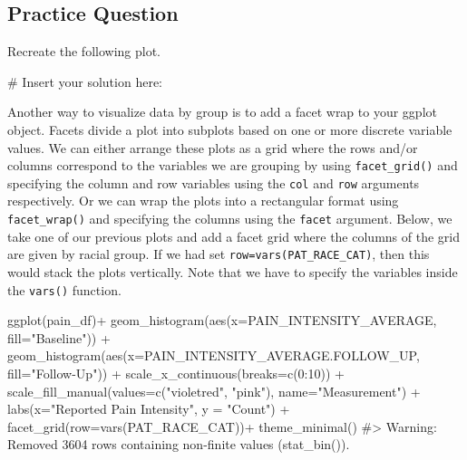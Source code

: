 \documentclass[
  letterpaper,
]{krantz}
\makeatletter
\newenvironment{Shaded}{\begin{snugshade}}{\end{snugshade}}
\newcommand{\AttributeTok}[1]{\textcolor[rgb]{0.40,0.45,0.13}{#1}}
\newcommand{\CommentTok}[1]{\textcolor[rgb]{0.37,0.37,0.37}{#1}}
\newcommand{\DecValTok}[1]{\textcolor[rgb]{0.68,0.00,0.00}{#1}}
\newcommand{\FunctionTok}[1]{\textcolor[rgb]{0.28,0.35,0.67}{#1}}
\newcommand{\NormalTok}[1]{\textcolor[rgb]{0.00,0.23,0.31}{#1}}
\newcommand{\SpecialCharTok}[1]{\textcolor[rgb]{0.37,0.37,0.37}{#1}}
\newcommand{\StringTok}[1]{\textcolor[rgb]{0.13,0.47,0.30}{#1}}
\newenvironment{kframe}{%
\medskip{}
\setlength{\fboxsep}{.8em}
 \def\at@end@of@kframe{}%
 \ifinner\ifhmode%
  \def\at@end@of@kframe{\end{minipage}}%
  \begin{minipage}{\columnwidth}%
 \fi\fi%
 \def\FrameCommand##1{\hskip\@totalleftmargin \hskip-\fboxsep
 \colorbox{shadecolor}{##1}\hskip-\fboxsep
     \hskip-\linewidth \hskip-\@totalleftmargin \hskip\columnwidth}%
 \MakeFramed {\advance\hsize-\width
   \@totalleftmargin\z@ \linewidth\hsize
   \@setminipage}}%
 {\par\unskip\endMakeFramed%
 \at@end@of@kframe}
\renewenvironment{Shaded}{\begin{kframe}}{\end{kframe}}
\makeatother
\begin{document}
\hypertarget{practice-question-14}{%
\subsection{Practice Question}\label{practice-question-14}}

Recreate the following plot.

\begin{Shaded}
\begin{Highlighting}[]
\CommentTok{\# Insert your solution here:}
\end{Highlighting}
\end{Shaded}

Another way to visualize data by group is to add a facet wrap to your
ggplot object. Facets divide a plot into subplots based on one or more
discrete variable values. We can either arrange these plots as a grid
where the rows and/or columns correspond to the variables we are
grouping by using \texttt{facet\_grid()} and specifying the column and
row variables using the \texttt{col} and \texttt{row} arguments
respectively. Or we can wrap the plots into a rectangular format using
\texttt{facet\_wrap()} and specifying the columns using the
\texttt{facet} argument. Below, we take one of our previous plots and
add a facet grid where the columns of the grid are given by racial
group. If we had set \texttt{row=vars(PAT\_RACE\_CAT)}, then this would
stack the plots vertically. Note that we have to specify the variables
inside the \texttt{vars()} function.

\begin{Shaded}
\begin{Highlighting}[]
\FunctionTok{ggplot}\NormalTok{(pain\_df)}\SpecialCharTok{+}
  \FunctionTok{geom\_histogram}\NormalTok{(}\FunctionTok{aes}\NormalTok{(}\AttributeTok{x=}\NormalTok{PAIN\_INTENSITY\_AVERAGE, }\AttributeTok{fill=}\StringTok{"Baseline"}\NormalTok{)) }\SpecialCharTok{+}
  \FunctionTok{geom\_histogram}\NormalTok{(}\FunctionTok{aes}\NormalTok{(}\AttributeTok{x=}\NormalTok{PAIN\_INTENSITY\_AVERAGE.FOLLOW\_UP, }\AttributeTok{fill=}\StringTok{"Follow{-}Up"}\NormalTok{)) }\SpecialCharTok{+}
  \FunctionTok{scale\_x\_continuous}\NormalTok{(}\AttributeTok{breaks=}\FunctionTok{c}\NormalTok{(}\DecValTok{0}\SpecialCharTok{:}\DecValTok{10}\NormalTok{)) }\SpecialCharTok{+} 
  \FunctionTok{scale\_fill\_manual}\NormalTok{(}\AttributeTok{values=}\FunctionTok{c}\NormalTok{(}\StringTok{"violetred"}\NormalTok{, }\StringTok{"pink"}\NormalTok{), }\AttributeTok{name=}\StringTok{"Measurement"}\NormalTok{) }\SpecialCharTok{+}
  \FunctionTok{labs}\NormalTok{(}\AttributeTok{x=}\StringTok{"Reported Pain Intensity"}\NormalTok{, }\AttributeTok{y =} \StringTok{"Count"}\NormalTok{) }\SpecialCharTok{+}
  \FunctionTok{facet\_grid}\NormalTok{(}\AttributeTok{row=}\FunctionTok{vars}\NormalTok{(PAT\_RACE\_CAT))}\SpecialCharTok{+}
  \FunctionTok{theme\_minimal}\NormalTok{()}
\CommentTok{\#\textgreater{} Warning: Removed 3604 rows containing non{-}finite values (\textasciigrave{}stat\_bin()\textasciigrave{}).}
\end{Highlighting}
\end{Shaded}
\end{document}
